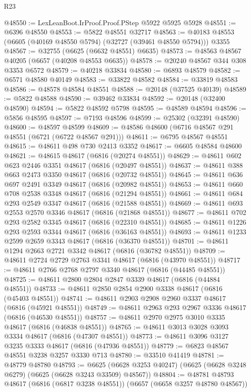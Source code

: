 \begin{lexlean}{R23}
\begin{coremodule}
@48550 := LexLeanBoot.IrProof.Proof.PStep @5922 @5925 @5928
@48551 := @6396 @48550
@48553 := @5822 @48551 @32717
@48563 := @40183 @48553 (@6605 (@40169 @48550 @5794) (@32727 (@39461 @48550 @5794))) @3355
@48567 := @32755 (@6625 (@6632 @48551) @6635)
@48573 := @48563 @48567 @40205 (@6657 (@40208 @48553 @6635))
@48578 := @20240 @48567 @344 @308 @3353 @6572
@48579 := @40218 @33834
@48580 := @6893 @48579
@48582 := @6571 @48580 @40149
@48583 := @33822 @48582
@48584 := @33819 @48583
@48586 := @48578 @48584 @48551
@48588 := @20148 (@37525 @40139)
@48589 := @5822 @48588
@48590 := @39462 @33834
@48592 := @20148 (@32400 @48590)
@48594 := @5822 @48592 @5798
@48595 := @48589 @48594
@48596 := @5856 @48595
@48597 := @7193 @48596
@48599 := @25302 (@32391 @48590)
@48600 := @48597 @48599
@48609 := @48586 @48600 (@6716 @48567 @291 @48551 (@6721 (@6722 @48567 @291)))
@48611 := @6795 @48567 @48551
@48615 := @48611 @498 @730 @2413 @3352
@48617 := @6605 @48584 @48600
@48621 := @48615 @48617 (@6816 (@20274 @48551))
@48629 := @48611 @602 @623 @2446 @3351 @48617 (@6816 (@20497 @48551))
@48637 := @48611 @388 @663 @2473 @3350 @48617 (@6816 (@20732 @48551))
@48645 := @48611 @636 @697 @2491 @3349 @48617 (@6816 (@20982 @48551))
@48653 := @48611 @660 @708 @2538 @3348 @48617 (@6816 (@21294 @48551))
@48661 := @48611 @684 @293 @2549 @3347 @48617 (@6816 (@21588 @48551))
@48669 := @48611 @693 @2553 @2570 @3346 @48617 (@6816 (@21868 @48551))
@48677 := @48611 @702 @293 @2582 @3345 @48617 (@6816 (@22310 @48551))
@48685 := @48611 @1226 @293 @2593 @3344 @48617 (@6816 (@36163 @48551))
@48693 := @48611 @1233 @2599 @2659 @3343 @48617 (@6816 (@36370 @48551))
@48701 := @48611 @1294 @2663 @2721 @3342 @48617 (@6816 (@36782 @48551))
@48709 := @48611 @2724 @2729 @2763 @3341 @48617 (@6816 (@43970 @48551))
@48717 := @48611 @2766 @2768 @2797 @3340 @48617 (@6816 (@44485 @48551))
@48725 := @48611 @2800 @2804 @2847 @3339 @48617 (@6816 (@44884 @48551))
@48733 := @48611 @2850 @2854 @2900 @3338 @48617 (@6816 (@45403 @48551))
@48741 := @48611 @2903 @2908 @2960 @3337 @48617 (@6816 (@45921 @48551))
@48749 := @48611 @2963 @293 @2967 @3336 @48617 (@6816 (@46530 @48551))
@48757 := @48611 @2970 @2975 @3010 @3335 @48617 (@6816 (@46838 @48551))
@48765 := @48611 @3013 @3028 @3093 @3334 @48617 (@6816 (@47307 @48551))
@48773 := @48611 @3096 @3127 @3235 @3333 @48617 (@6816 (@47936 @48551))
@48779 := @6823 @48567 @48551 @3238 @3257 @3330 @713
@48780 := @33510 @41419
@48781 := @48779 @48780
@48793 := @6625 (@6628 @3253 @40247) (@6625 (@6628 @3248 @6279) (@6625 (@6628 @3243 @33509) @48567))
@48804 := @48781 @48793 @48617 (@6816 (@6817 @3238 @48551)) (@6657 (@6658 @3257 @48780 @48567))

\end{coremodule}
\end{lexlean}

